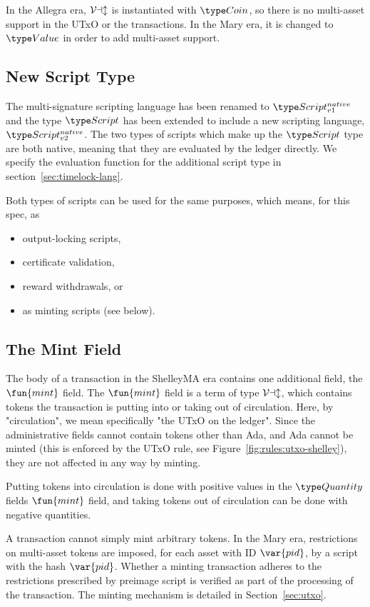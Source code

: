 In the Allegra era, $\mathcal{Val}$ is instantiated with $\Coin$, so there is no
multi-asset support in the UTxO or the transactions. In the Mary era, it
is changed to $\Value$ in order to add multi-asset support.

\subsection*{New Script Type}

The multi-signature scripting language has been renamed to $\ScriptNI$ and
the type $\Script$ has been extended to include a new scripting language,
$\Timelock$. The two types of scripts which make up the $\Script$ type are both
native, meaning
that they are evaluated by the ledger directly. We specify the evaluation
function for the additional script type in section~\ref{sec:timelock-lang}.

Both types of scripts can be used for the same purposes, which means, for this
spec, as

\begin{itemize}
  \item output-locking scripts,
  \item certificate validation,
  \item reward withdrawals, or
  \item as minting scripts (see below).
\end{itemize}

\subsection*{The Mint Field}

The body of a transaction in the ShelleyMA era contains one additional
field, the $\fun{mint}$ field.
The $\fun{mint}$ field is a term of type $\mathcal{Val}$, which contains
tokens the transaction is putting into or taking out of
circulation. Here, by "circulation", we mean specifically "the UTxO on the
ledger". Since the administrative fields cannot contain tokens other than Ada,
and Ada cannot be minted (this is enforced by the UTxO rule, see Figure~\ref{fig:rules:utxo-shelley}),
they are not affected in any way by minting.

Putting tokens into circulation is done with positive values in the $\Quantity$
fields $\fun{mint}$ field, and taking tokens out of circulation can be done
with negative quantities.

A transaction cannot simply mint arbitrary tokens. In the Mary era, restrictions on
multi-asset tokens are imposed, for each asset with ID $\var{pid}$, by a script
with the hash $\var{pid}$. Whether a minting transaction adheres to the restrictions
prescribed by preimage script is verified as part of the processing of the transaction.
The minting mechanism is detailed in Section~\ref{sec:utxo}.

